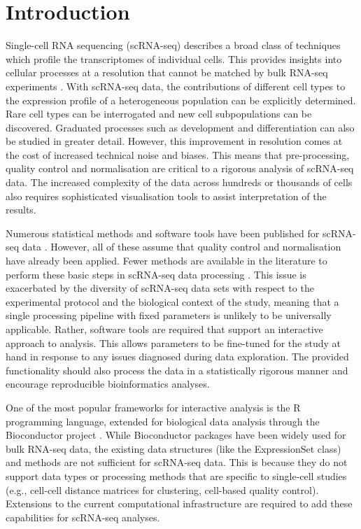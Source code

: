 \documentclass{bioinfo}
\begin{document}
\maketitle

\section{Introduction}\label{introduction}

Single-cell RNA sequencing (scRNA-seq) describes a broad class of techniques which profile the transcriptomes of individual cells. This provides insights into cellular processes at a resolution that cannot be matched by bulk RNA-seq experiments \citep{Hebenstreit2011-ig,Shalek2013-kf}. With scRNA-seq data, the contributions of different cell types to the expression profile of a heterogeneous population can be explicitly determined. Rare cell types can be interrogated and new cell subpopulations can be discovered. Graduated processes such as development and differentiation can also be studied in greater detail. However, this improvement in resolution comes at the cost of increased technical noise and biases. This means that pre-processing, quality control and normalisation are critical to a rigorous analysis of scRNA-seq data. The increased complexity of the data across hundreds or thousands of cells also requires sophisticated visualisation tools to assist interpretation of the results.

Numerous statistical methods and software tools have been published for scRNA-seq data \citep{Guo2015-wx,Kharchenko2014-rx,Finak2015-rd,Delmans2016-qc,Angerer2015-sw,Kiselev2016-fu,Julia2015-jt,Trapnell2014-gj}. However, all of these assume that quality control and normalisation have already been applied. Fewer methods are available in the literature to perform these basic steps in scRNA-seq data processing \citep{Ilicic2016-dm}. This issue is exacerbated by the diversity of scRNA-seq data sets with respect to the experimental protocol and the biological context of the study, meaning that a single processing pipeline with fixed parameters is unlikely to be universally applicable. Rather, software tools are required that support an interactive approach to analysis. This allows parameters to be fine-tuned for the study at hand in response to any issues diagnosed during data exploration. The provided functionality should also process the data in a statistically rigorous manner and encourage reproducible bioinformatics analyses.

One of the most popular frameworks for interactive analysis is the R programming language, extended for biological data analysis through the Bioconductor project \citep{Huber2015-en}. While Bioconductor packages have been widely used for bulk RNA-seq data, the existing data structures (like the ExpressionSet class) and methods are not sufficient for scRNA-seq data. This is because they do not support data types or processing methods that are specific to single-cell studies (e.g., cell-cell distance matrices for clustering, cell-based quality control). Extensions to the current computational infrastructure are required to add these capabilities for scRNA-seq analyses.
\end{document}
